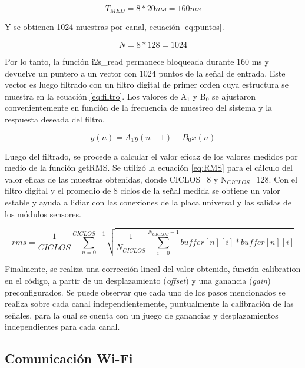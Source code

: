 \begin{equation}
	\label{eq:TMED}
	T_{MED} = 8 * 20 ms = 160 ms
\end{equation}

Y se obtienen 1024 muestras por canal, ecuación \ref{eq:puntos}.

\begin{equation}
	\label{eq:puntos}
	N = 8 * 128 = 1024
\end{equation}

Por lo tanto, la función i2s\_read permanece bloqueada durante 160 ms y devuelve un puntero a un vector con 1024 puntos de la señal de entrada. Este vector es luego filtrado con un filtro digital de primer orden cuya estructura se muestra en la ecuación \ref{eq:filtro}. Los valores de A$_{1}$ y B$_{0}$ se ajustaron convenientemente en función de la frecuencia de muestreo del sistema y la respuesta deseada del filtro.

\begin{equation}
	\label{eq:filtro}
	y\left( n \right) = A_1 y\left( n-1 \right) + B_0 x\left( n \right)
\end{equation}

Luego del filtrado, se procede a calcular el valor eficaz de los valores medidos por medio de la función getRMS. Se utilizó la ecuación \ref{eq:RMS} para el cálculo del valor eficaz de las muestras obtenidas, donde CICLOS=8 y N$_{CICLOS}$=128. Con el filtro digital y el promedio de 8 ciclos de la señal medida se obtiene un valor estable y ayuda a lidiar con las conexiones de la placa universal y las salidas de los módulos sensores.

\begin{equation}
	\label{eq:RMS}
rms=\frac{1}{CICLOS}\sum_{n=0}^{CICLOS-1}\sqrt{\frac{1}{N_{CICLOS}}\sum_{i=0}^{ N_{CICLOS}-1} buffer\left [ n \right ]\left [ i \right ]*buffer\left [ n \right ]\left [ i \right ]}
\end{equation}

Finalmente, se realiza una corrección lineal del valor obtenido, función calibration en el código, a partir de un desplazamiento (\textit{offset}) y una ganancia (\textit{gain}) preconfigurados. Se puede observar que cada uno de los pasos mencionados se realiza sobre cada canal independientemente, puntualmente la calibración de las señales, para la cual se cuenta con un juego de ganancias y desplazamientos independientes para cada canal.

\subsection{Comunicación Wi-Fi}

